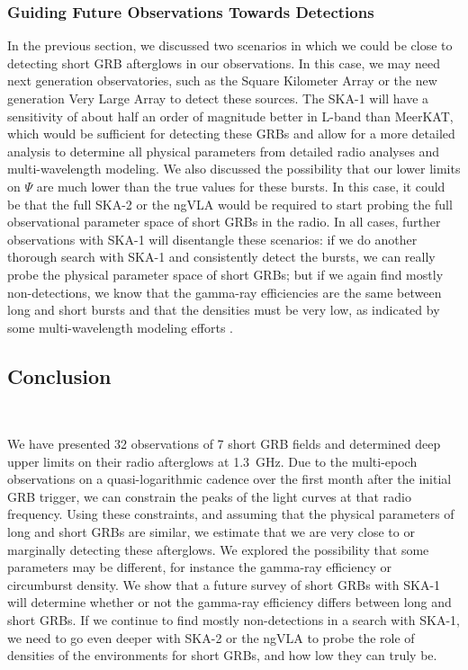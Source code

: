 \documentclass[12pt]{article}
\begin{document}
\subsubsection{Guiding Future Observations Towards Detections}

In the previous section, we discussed two scenarios in which we could be close to detecting short GRB afterglows in our observations. In this case, we may need next generation observatories, such as the Square Kilometer Array \citep[SKA;][]{2009IEEEP..97.1482D} or the new generation Very Large Array \citep[ngVLA;][]{2018ASPC..517....3M} to detect these sources. The SKA-1 will have a sensitivity of about half an order of magnitude better in L-band than MeerKAT, which would be sufficient for detecting these GRBs and allow for a more detailed analysis to determine all physical parameters from detailed radio analyses and multi-wavelength modeling. We also discussed the possibility that our lower limits on $\Psi$ are much lower than the true values for these bursts. In this case, it could be that the full SKA-2 or the ngVLA would be required to start probing the full observational parameter space of short GRBs in the radio. In all cases, further observations with SKA-1 will disentangle these scenarios: if we do another thorough search with SKA-1 and consistently detect the bursts, we can really probe the physical parameter space of short GRBs; but if we again find mostly non-detections, we know that the gamma-ray efficiencies are the same between long and short bursts and that the densities must be very low, as indicated by some multi-wavelength modeling efforts \citep[e.g.,][]{2015ApJ...815..102F}. 





\subsection{Conclusion}
~\label{sec:conclusion5}

We have presented 32 observations of 7 short GRB fields and determined deep upper limits on their radio afterglows at 1.3~GHz. Due to the multi-epoch observations on a quasi-logarithmic cadence over the first month after the initial GRB trigger, we can constrain the peaks of the light curves at that radio frequency. Using these constraints, and assuming that the physical parameters of long and short GRBs are similar, we estimate that we are very close to or marginally detecting these afterglows. We explored the possibility that some parameters may be different, for instance the gamma-ray efficiency or circumburst density. We show that a future survey of short GRBs with SKA-1 will determine whether or not the gamma-ray efficiency differs between long and short GRBs. If we continue to find mostly non-detections in a search with SKA-1, we need to go even deeper with SKA-2 or the ngVLA to probe the role of densities of the environments for short GRBs, and how low they can truly be.
\end{document}
